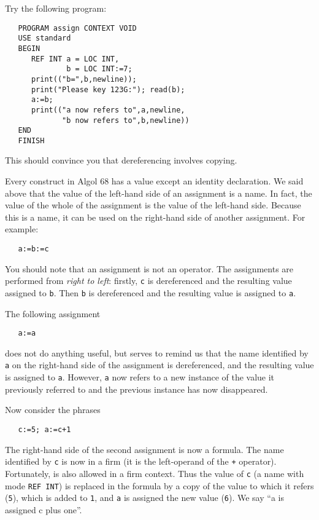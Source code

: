 Try the following program:
\begin{verbatim}
   PROGRAM assign CONTEXT VOID
   USE standard
   BEGIN
      REF INT a = LOC INT,
              b = LOC INT:=7;
      print(("b=",b,newline));
      print("Please key 123G:"); read(b);
      a:=b;
      print(("a now refers to",a,newline,
             "b now refers to",b,newline))
   END
   FINISH
\end{verbatim}
\noindent
This should convince you that dereferencing involves copying.

Every construct in Algol 68 has a value except an identity
declaration. We said above that the value of the left-hand side of an
assignment is a name. In fact, the value of the whole of the
assignment is the value of the left-hand side. Because this is a
name, it can be used on the right-hand side of another assignment.
For example:
\begin{verbatim}
   a:=b:=c
\end{verbatim}
\noindent
You should note that an assignment is not an operator. The assignments
are performed from \emph{right to left}: firstly, \verb|c| is
dereferenced and the resulting value assigned to \verb|b|. Then
\verb|b| is dereferenced and the resulting value is assigned to
\verb|a|.

The following assignment
\begin{verbatim}
   a:=a
\end{verbatim}
\noindent
does not do anything useful, but serves to remind us that the name
identified by \verb|a| on the right-hand side of the assignment is
dereferenced, and the resulting value is assigned to \verb|a|. However,
\verb|a| now refers to a new instance of the value it previously
referred to and the previous instance has now disappeared.

Now consider the phrases
\begin{verbatim}
   c:=5; a:=c+1
\end{verbatim}
\noindent
The right-hand side of the second assignment is now a formula. The
name identified by \verb|c| is now in a firm
 (it is the left-operand of the \verb|+|
operator).  Fortunately, 
is also allowed in a firm context.  Thus the value of \verb|c| (a
name with mode \verb|REF INT|) is replaced in the formula by a copy
of the value to which it refers (\verb|5|), which is added to
\verb|1|, and \verb|a| is assigned the new value (\verb|6|).  We say
``a is assigned c plus one''.

